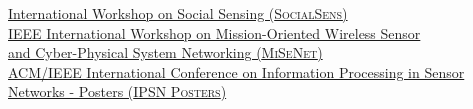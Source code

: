 {\href{https://www.cse.buffalo.edu/~lusu/SocialSens2018/}{International Workshop on Social Sensing (\textsc{SocialSens})}} \\
{\href{http://infocom2018.ieee-infocom.org/content/workshop-misenet-mission-oriented-wireless-sensor-networking}{IEEE International Workshop on Mission-Oriented Wireless Sensor \\\mbox{\hspace{0.6cm}} and Cyber-Physical System Networking (\textsc{MiSeNet})}} \\
{\href{http://ipsn.acm.org/2016/posters.html}{ACM/IEEE International Conference on Information Processing in Sensor\\\mbox{\hspace{0.6cm}} Networks - Posters (\textsc{IPSN Posters})}} \\
\vspace{-0.6cm}

